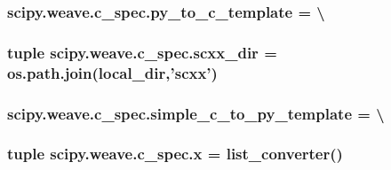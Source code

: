 \subsubsection[{py\+\_\+to\+\_\+c\+\_\+template}]{\setlength{\rightskip}{0pt plus 5cm}scipy.\+weave.\+c\+\_\+spec.\+py\+\_\+to\+\_\+c\+\_\+template = \textbackslash{}}\label{namespacescipy_1_1weave_1_1c__spec_ad510ac3aa3d5ab423532ed5f4003e97a}
\hypertarget{namespacescipy_1_1weave_1_1c__spec_aa949098eca50c7217dc9f43fe14c5a37}{}
\subsubsection[{scxx\+\_\+dir}]{\setlength{\rightskip}{0pt plus 5cm}tuple scipy.\+weave.\+c\+\_\+spec.\+scxx\+\_\+dir = os.\+path.\+join(local\+\_\+dir,'scxx')}\label{namespacescipy_1_1weave_1_1c__spec_aa949098eca50c7217dc9f43fe14c5a37}
\hypertarget{namespacescipy_1_1weave_1_1c__spec_addc46877ce83db84236b0399712d5d9e}{}
\subsubsection[{simple\+\_\+c\+\_\+to\+\_\+py\+\_\+template}]{\setlength{\rightskip}{0pt plus 5cm}scipy.\+weave.\+c\+\_\+spec.\+simple\+\_\+c\+\_\+to\+\_\+py\+\_\+template = \textbackslash{}}\label{namespacescipy_1_1weave_1_1c__spec_addc46877ce83db84236b0399712d5d9e}
\hypertarget{namespacescipy_1_1weave_1_1c__spec_a11da7db863b01f5a039757784edcb308}{}
\subsubsection[{x}]{\setlength{\rightskip}{0pt plus 5cm}tuple scipy.\+weave.\+c\+\_\+spec.\+x = {\bf list\+\_\+converter}()}\label{namespacescipy_1_1weave_1_1c__spec_a11da7db863b01f5a039757784edcb308}
